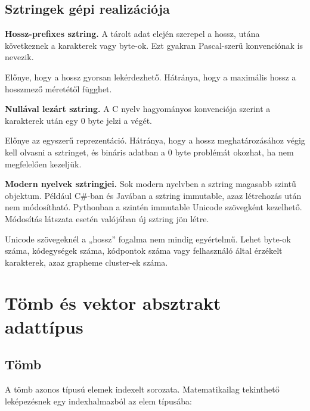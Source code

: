 \subsection{Sztringek gépi realizációja}

\textbf{Hossz-prefixes sztring.} A tárolt adat elején szerepel a hossz, utána következnek a karakterek vagy byte-ok. Ezt gyakran Pascal-szerű konvenciónak is nevezik.


Előnye, hogy a hossz gyorsan lekérdezhető. Hátránya, hogy a maximális hossz a hosszmező méretétől függhet.

\textbf{Nullával lezárt sztring.} A C nyelv hagyományos konvenciója szerint a karakterek után egy $0$ byte jelzi a végét.


Előnye az egyszerű reprezentáció. Hátránya, hogy a hossz meghatározásához végig kell olvasni a sztringet, és bináris adatban a 0 byte problémát okozhat, ha nem megfelelően kezeljük.

\textbf{Modern nyelvek sztringjei.} Sok modern nyelvben a sztring magasabb szintű objektum. Például C\#-ban és Javában a sztring immutable, azaz létrehozás után nem módosítható. Pythonban a  szintén immutable Unicode szövegként kezelhető. Módosítás látszata esetén valójában új sztring jön létre.

\begin{warningbox}
Unicode szövegeknél a „hossz” fogalma nem mindig egyértelmű. Lehet byte-ok száma, kódegységek száma, kódpontok száma vagy felhasználó által érzékelt karakterek, azaz grapheme cluster-ek száma.
\end{warningbox}

\section{Tömb és vektor absztrakt adattípus}

\subsection{Tömb}

A tömb azonos típusú elemek indexelt sorozata. Matematikailag tekinthető leképezésnek egy indexhalmazból az elem típusába:

